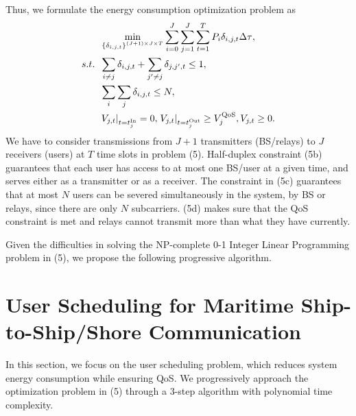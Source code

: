 \documentclass[journal]{IEEEtran}
\begin{document}
 Thus, we formulate the energy consumption optimization problem as
 \begin{subequations}
 \begin{align}
 & \mathop {\min }\limits_{{\left\{ {{\delta _{i,j,t}}} \right\}^{\left( {J + 1} \right) \times J \times T}}}  {\sum\limits_{i = 0}^J {\sum\limits_{j = 1}^J {\sum\limits_{t = 1}^{T} {{P_{i}}\delta _{i,j,t} \Delta \tau } } } }  ,\\
  {s.t.} \;\; &\sum\limits_{i \ne j} {{{\delta _{i,j,t}}} } + \sum\limits_{j' \ne j} { {{\delta _{j,j',t}}} \le {1}} ,\\
  \;\;\;\;\;\; &\sum\limits_i {\sum\limits_j { {{\delta _{i,j,t}}} } } \le N ,\\
  \;\;\;\;\;\; &{{{\left. {{V_{j,t}}} \right|}_{t = t_j^{{\rm{In}}}}} = 0, \left. {{V_{j,t}}} \right|_{t = t_j^{{\rm{Out}}}}} \ge V_j^{\rm{QoS}}, {V_{j,t}} \ge 0.
 \end{align}
 \end{subequations}
 We have to consider transmissions from ${J + 1}$ transmitters (BS/relays) to $J$ receivers (users) at $T$ time slots in problem (5). 
 Half-duplex constraint (5b) guarantees that each user has access to at most one BS/user at a given time, and serves either as a transmitter or as a receiver. The constraint in (5c) guarantees that at most $N$ users can be severed simultaneously in the system, by BS or relays, since there are only $N$ subcarriers. (5d) makes sure that the QoS constraint is met and relays cannot transmit more than what they have currently.
 
 Given the difficulties in solving the NP-complete \cite{p1000} 0-1 Integer Linear Programming problem in (5), we propose the following progressive algorithm. 
 
 
 \section{User Scheduling for Maritime Ship-to-Ship/Shore Communication}\label{sec:3}
 
 In this section, we focus on the user scheduling problem, which reduces system energy consumption while ensuring QoS. We progressively approach the optimization problem in (5) through a 3-step algorithm with polynomial time complexity.
 
\end{document}

